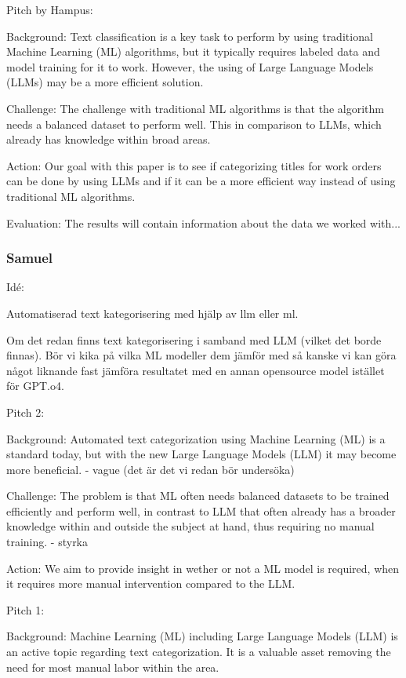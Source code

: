\documentclass{article}
\begin{document}
Pitch by Hampus:

Background:
Text classification is a key task to perform by using traditional Machine Learning (ML) algorithms,
but it typically requires labeled data and model training for it to work. However, the using
of Large Language Models (LLMs) may be a more efficient solution.

Challenge:
The challenge with traditional ML algorithms is that the algorithm needs a balanced dataset to
perform well. This in comparison to LLMs, which already has knowledge within broad areas.

Action:
Our goal with this paper is to see if categorizing titles for work orders can be done by
using LLMs and if it can be a more efficient way instead of using traditional ML algorithms.

Evaluation:
The results will contain information about the data we worked with...

\subsubsection{Samuel}

Idé:

Automatiserad text kategorisering med hjälp av llm eller ml.

Om det redan finns text kategorisering i samband med LLM (vilket det borde finnas).
Bör vi kika på vilka ML modeller dem jämför med så kanske vi kan göra något liknande fast jämföra
resultatet med en annan opensource model istället för GPT.o4.

Pitch 2:

Background:
Automated text categorization using Machine Learning (ML) is a standard today, but with the new
Large Language Models (LLM) it may become more beneficial. - vague (det är det vi redan bör undersöka)

Challenge:
The problem is that ML often needs balanced datasets to be trained efficiently and perform well,
in contrast to LLM that often already has a broader knowledge within and outside the subject at hand,
thus requiring no manual training. - styrka

Action:
We aim to provide insight in wether or not a ML model is required, when it requires more manual
intervention compared to the LLM.


Pitch 1:

Background:
Machine Learning (ML) including Large Language Models (LLM) is an active topic regarding text
categorization. It is a valuable asset removing the need for most manual labor within the area.
\end{document}
